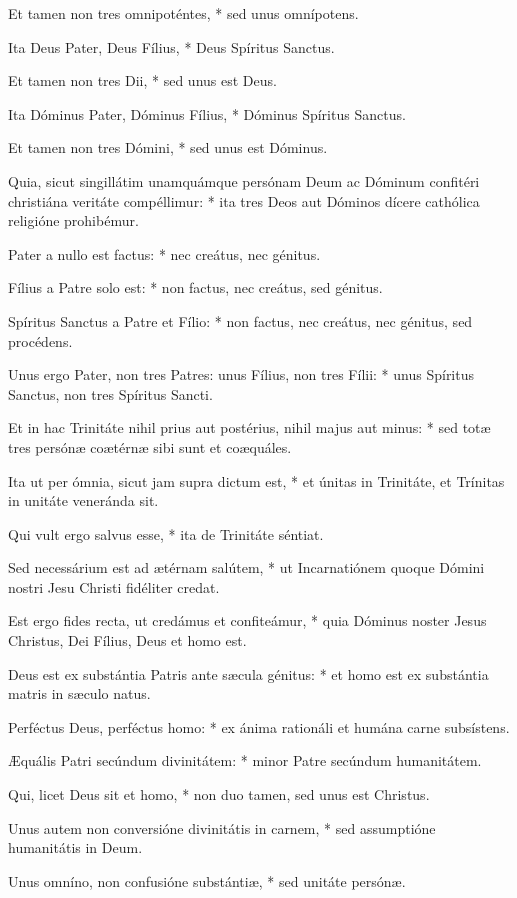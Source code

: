 Et tamen non tres omnipoténtes, * sed unus omnípotens.

Ita Deus Pater, Deus Fílius, * Deus Spíritus Sanctus.

Et tamen non tres Dii, * sed unus est Deus.

Ita Dóminus Pater, Dóminus Fílius, * Dóminus Spíritus Sanctus.

Et tamen non tres Dómini, * sed unus est Dóminus.

Quia, sicut singillátim unamquámque persónam Deum ac Dóminum confitéri christiána veritáte compéllimur: * ita tres Deos aut Dóminos dícere cathólica religióne prohibémur.

Pater a nullo est factus: * nec creátus, nec génitus.

Fílius a Patre solo est: * non factus, nec creátus, sed génitus.

Spíritus Sanctus a Patre et Fílio: * non factus, nec creátus, nec génitus, sed procédens.

Unus ergo Pater, non tres Patres: unus Fílius, non tres Fílii: * unus Spíritus Sanctus, non tres Spíritus Sancti.

Et in hac Trinitáte nihil prius aut postérius, nihil majus aut minus: * sed totæ tres persónæ coætérnæ sibi sunt et coæquáles.

Ita ut per ómnia, sicut jam supra dictum est, * et únitas in Trinitáte, et Trínitas in unitáte veneránda sit.

Qui vult ergo salvus esse, * ita de Trinitáte séntiat.

Sed necessárium est ad ætérnam salútem, * ut Incarnatiónem quoque Dómini nostri Jesu Christi fidéliter credat.

Est ergo fides recta, ut credámus et confiteámur, * quia Dóminus noster Jesus Christus, Dei Fílius, Deus et homo est.

Deus est ex substántia Patris ante sæcula génitus: * et homo est ex substántia matris in sæculo natus.

Perféctus Deus, perféctus homo: * ex ánima rationáli et humána carne subsístens.

Æquális Patri secúndum divinitátem: * minor Patre secúndum humanitátem.

Qui, licet Deus sit et homo, * non duo tamen, sed unus est Christus.

Unus autem non conversióne divinitátis in carnem, * sed assumptióne humanitátis in Deum.

Unus omníno, non confusióne substántiæ, * sed unitáte persónæ.

